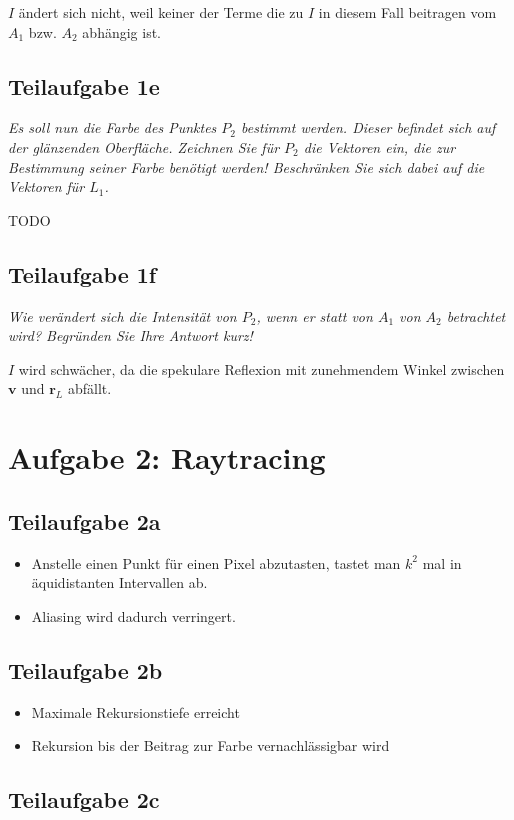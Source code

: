 \documentclass[a4paper]{scrartcl}
\begin{document}
$I$ ändert sich nicht, weil keiner der Terme die zu $I$ in diesem Fall beitragen
vom $A_1$ bzw. $A_2$ abhängig ist.

\subsection*{Teilaufgabe 1e}
\textit{Es soll nun die Farbe des Punktes $P_2$ bestimmt werden. Dieser
befindet sich auf der glänzenden Oberfläche. Zeichnen Sie für $P_2$ die
Vektoren ein, die zur Bestimmung seiner Farbe benötigt werden! Beschränken Sie
sich dabei auf die Vektoren für $L_1$.}

TODO

\subsection*{Teilaufgabe 1f}
\textit{Wie verändert sich die Intensität von $P_2$, wenn er statt von $A_1$
von $A_2$ betrachtet wird? Begründen Sie Ihre Antwort kurz!}

$I$ wird schwächer, da die spekulare Reflexion mit zunehmendem Winkel zwischen $\mathbf{v}$ und $\mathbf{r}_L$ abfällt.

\section*{Aufgabe 2: Raytracing}
\subsection*{Teilaufgabe 2a}
\begin{itemize}
    \item Anstelle einen Punkt für einen Pixel abzutasten, tastet man
          $k^2$ mal in äquidistanten Intervallen ab.
    \item Aliasing wird dadurch verringert.
\end{itemize}

\subsection*{Teilaufgabe 2b}
\begin{itemize}
    \item Maximale Rekursionstiefe erreicht
    \item Rekursion bis der Beitrag zur Farbe vernachlässigbar wird
\end{itemize}

\subsection*{Teilaufgabe 2c}
\end{document}
